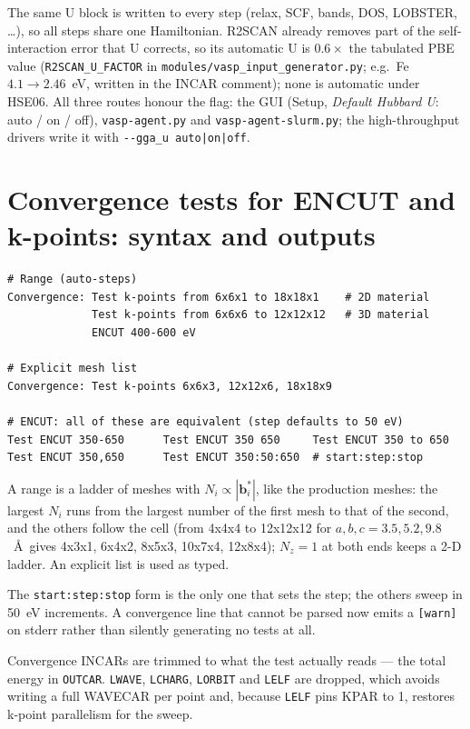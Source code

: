 \documentclass[11pt,a4paper]{scrartcl}
\begin{document}
The same U block is written to every step (relax, SCF, bands, DOS, LOBSTER,
\ldots), so all steps share one Hamiltonian.  R2SCAN already removes part of the
self-interaction error that U corrects, so its automatic U is $0.6\times$ the tabulated PBE
value (\texttt{R2SCAN\_U\_FACTOR} in \texttt{modules/vasp\_input\_generator.py}; e.g.\ Fe
$4.1 \to 2.46$~eV, written in the INCAR comment); none is automatic under HSE06.  All three routes honour the flag: the GUI (Setup,
\emph{Default Hubbard U}: auto / on / off), \texttt{vasp-agent.py} and
\texttt{vasp-agent-slurm.py}; the high-throughput drivers write it with
\texttt{-{}-gga\_u auto|on|off}.

\section{Convergence tests for ENCUT and k-points: syntax and outputs}
\label{sec:conv}

\begin{lstlisting}
# Range (auto-steps)
Convergence: Test k-points from 6x6x1 to 18x18x1    # 2D material
             Test k-points from 6x6x6 to 12x12x12   # 3D material
             ENCUT 400-600 eV

# Explicit mesh list
Convergence: Test k-points 6x6x3, 12x12x6, 18x18x9

# ENCUT: all of these are equivalent (step defaults to 50 eV)
Test ENCUT 350-650      Test ENCUT 350 650     Test ENCUT 350 to 650
Test ENCUT 350,650      Test ENCUT 350:50:650  # start:step:stop
\end{lstlisting}

A range is a ladder of meshes with $N_i \propto |\mathbf{b}_i^*|$, like the
production meshes: the largest $N_i$ runs from the largest number of the first
mesh to that of the second, and the others follow the cell (from 4x4x4 to 12x12x12 for
$a,b,c = 3.5, 5.2, 9.8$~\AA\ gives 4x3x1, 6x4x2, 8x5x3, 10x7x4, 12x8x4); $N_z = 1$
at both ends keeps a 2-D ladder.  An explicit list is used as typed.

The \texttt{start:step:stop} form is the only one that sets the step; the
others sweep in 50~eV increments.  A convergence line that cannot be parsed
now emits a \texttt{[warn]} on stderr rather than silently generating no
tests at all.

Convergence INCARs are trimmed to what the test actually reads --- the total
energy in \texttt{OUTCAR}.  \texttt{LWAVE}, \texttt{LCHARG}, \texttt{LORBIT}
and \texttt{LELF} are dropped, which avoids writing a full WAVECAR per point
and, because \texttt{LELF} pins KPAR to 1, restores k-point parallelism for
the sweep.
\end{document}
